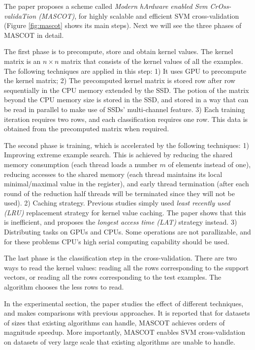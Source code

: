 \documentclass[paper=a4, fontsize=18pt]{article} %
\numberwithin{equation}{section} %
\numberwithin{figure}{section} %
\numberwithin{table}{section} %
\begin{document}
The paper proposes a scheme called \emph{Modern hArdware enabled Svm CrOss-validaTion (MASCOT)}, for highly scalable and efficient SVM cross-validation (Figure \ref{fig:mascot} shows its main steps). Next we will see the three phases of MASCOT in detail.

The first phase is to precompute, store and obtain kernel values. The kernel matrix is an $n \times n $ matrix that consists of the kernel values of all the examples. The following techniques are applied in this step: 1) It uses GPU to precompute the kernel matrix; 2) The precomputed kernel matrix is stored row after row sequentially in the CPU memory extended by the SSD. The potion of the matrix beyond the CPU memory size is stored in the SSD, and stored in a way that can be read in parallel to make use of SSDs' multi-channel feature. 3) Each training iteration requires two rows, and each classification requires one row. This data is obtained from the precomputed matrix when required.

The second phase is training, which is accelerated by the following techniques: 1) Improving extreme example search. This is achieved by reducing the shared memory consumption (each thread loads a number $m$ of elements instead of one), reducing accesses to the shared memory (each thread maintains its local minimal/maximal value in the register), and early thread termination (after each round of the reduction half threads will be terminated since they will not be used). 2) Caching strategy. Previous studies simply used \emph{least recently used (LRU)} replacement strategy for kernel value caching. The paper shows that this is inefficient, and proposes the \emph{longest access time (LAT)} strategy instead. 3) Distributing tasks on GPUs and CPUs. Some operations are not parallizable, and for these problems CPU's high serial computing capability should be used.

The last phase is the classification step in the cross-validation. There are two ways to read the kernel values: reading all the rows corresponding to the support vectors, or reading all the rows corresponding to the test examples. The algorithm chooses the less rows to read.

In the experimental section, the paper studies the effect of different techniques, and makes comparisons with previous approaches. It is reported that for datasets of sizes that existing algorithms can handle, MASCOT achieves orders of magnitude speedup. More importantly, MASCOT enables SVM cross-validation on datasets of very large scale that existing algorithms are unable to handle.
\end{document}
